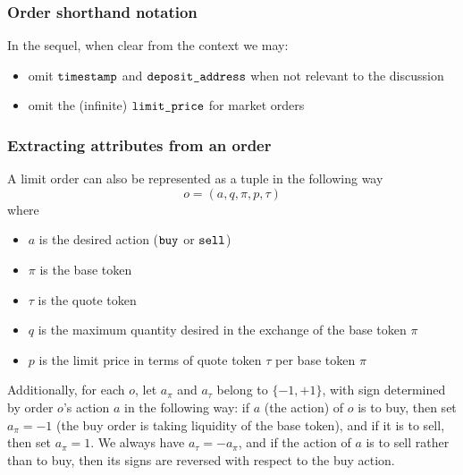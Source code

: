 \documentclass[11pt, reqno]{amsart}
\theoremstyle{definition}
\theoremstyle{remark}
\newcommand{\timestamp}{\textnormal{\texttt{timestamp}}}
\newcommand{\limitprice}{\textnormal{\texttt{limit\_price}}}
\newcommand{\depositaddress}{\textnormal{\texttt{deposit\_address}}}
\newcommand{\buy}{\textnormal{\texttt{buy}}}
\newcommand{\sell}{\textnormal{\texttt{sell}}}
\begin{document}
\subsubsection{Order shorthand notation}
In the sequel, when clear from the context we may:
\begin{itemize}
\item omit $\timestamp$ and $\depositaddress$ when not relevant to the
      discussion
\item omit the (infinite) $\limitprice$ for market orders
\end{itemize}

\subsubsection{Extracting attributes from an order}
A limit order can also be represented as a tuple in the following way
\[
	o = (a, q, \pi, p, \tau)
\]
where
\begin{itemize}
	\item $a$ is the desired action ($\buy$ or $\sell$)
    \item $\pi$ is the base token
    \item $\tau$ is the quote token
    \item $q$ is the maximum quantity desired in the exchange of the base token
          $\pi$
	\item $p$ is the limit price in terms of quote token $\tau$ per base token
          $\pi$
\end{itemize}
Additionally, for each $o$, let $a_\pi$ and $a_\tau$ belong to
$\{-1, +1\}$, with sign determined by order $o$'s action $a$ in the following
way: if $a$ (the action) of $o$ is to buy, then set $a_\pi = -1$ (the buy
order is taking liquidity of the base token), and if it is to sell, then
set $a_\pi = 1$. We always have $a_\tau = -a_\pi$, and if the action
of $a$ is to sell rather than to buy, then its signs are reversed with
respect to the buy action.
\end{document}
